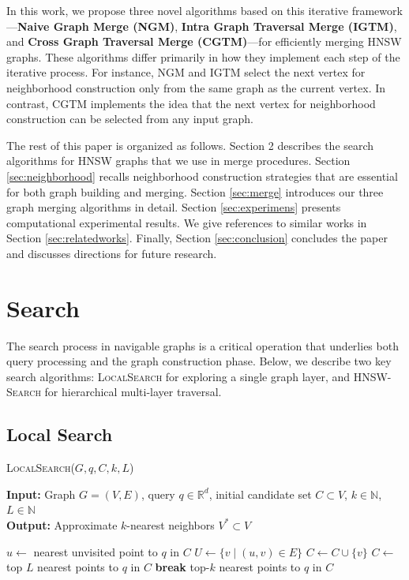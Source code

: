 \documentclass{article}
\begin{document}
In this work, we propose three novel algorithms based on this iterative framework—\textbf{Naive Graph Merge (NGM)}, \textbf{Intra Graph Traversal Merge (IGTM)}, and \textbf{Cross Graph Traversal Merge (CGTM)}—for efficiently merging HNSW graphs. These algorithms differ primarily in how they implement each step of the iterative process. For instance, NGM and IGTM select the next vertex for neighborhood construction only from the same graph as the current vertex. In contrast, CGTM implements the idea that the next vertex for neighborhood construction can be selected from any input graph.


The rest of this paper is organized as follows. Section 2 describes the search algorithms for HNSW graphs that we use in merge procedures. Section \ref{sec:neighborhood} recalls neighborhood construction strategies that are essential for both graph building and merging. Section \ref{sec:merge} introduces our three graph merging algorithms in detail. Section \ref{sec:experimens} presents computational experimental results. We give references to similar works in Section \ref{sec:relatedworks}. Finally, Section \ref{sec:conclusion} concludes the paper and discusses directions for future research.

\section{Search}
\label{sec:search}

The search process in navigable graphs is a critical operation that underlies both query processing and the graph construction phase. Below, we describe two key search algorithms: \textsc{LocalSearch} for exploring a single graph layer, and \textsc{HNSW-Search} for hierarchical multi-layer traversal.

\subsection{Local Search}

\begin{algorithm}
\caption{\textsc{LocalSearch}($G, q, C, k, L$)}\label{alg:local_search}
\textbf{Input:} Graph $G = (V, E)$, query $q \in \mathbb{R}^d$, initial candidate set $C \subset V$, $k \in \mathbb{N}$, $L \in \mathbb{N}$ \\
\textbf{Output:} Approximate $k$-nearest neighbors $V^* \subset V$
\begin{algorithmic}[1]
    \State $u \gets$ nearest unvisited point to $q$ in $C$
    \State $U \gets \{v \mid (u, v) \in E\}$
            \State $C \gets C \cup \{v\}$
        \EndIf
    \EndFor
        \State $C \gets$ top $L$ nearest points to $q$ in $C$
    \EndIf
        \State \textbf{break}
    \EndIf
\EndWhile
\State \Return top-$k$ nearest points to $q$ in $C$
\end{algorithmic}
\end{algorithm}
\end{document}
